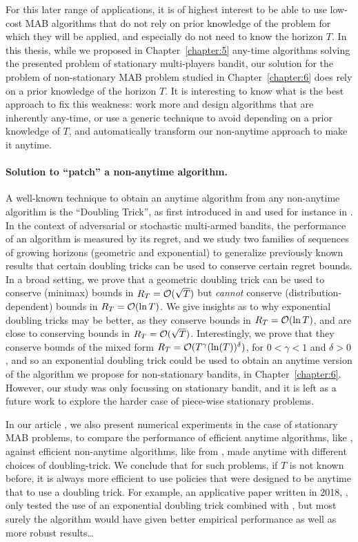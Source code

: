 For this later range of applications, it is of highest interest to be able to use low-cost MAB algorithms that do not rely on prior knowledge of the problem for which they will be applied, and especially do not need to know the horizon $T$.
In this thesis,
while we proposed in Chapter~\ref{chapter:5} any-time algorithms solving the presented problem of stationary multi-players bandit, our solution for the problem of non-stationary MAB problem studied in Chapter~\ref{chapter:6} does rely on a prior knowledge of the horizon $T$.
It is interesting to know what is the best approach to fix this weakness: work more and design algorithms that are inherently any-time, or use a generic technique to avoid depending on a prior knowledge of $T$, and automatically transform our non-anytime approach to make it anytime.


\paragraph{Solution to ``patch'' a non-anytime algorithm.}
%
A well-known technique to obtain an anytime algorithm from any non-anytime algorithm is the ``Doubling Trick'', as first introduced in \cite{CesaLugosi06} and used for instance in \cite{Auer10,AuerGajaneOrtner18}.
%
In the context of adversarial or stochastic multi-armed bandits,
the performance of an algorithm is measured by its regret,
and we study two families of sequences of growing horizons (geometric and exponential)
to generalize previously known results that certain doubling tricks can be used to conserve certain regret bounds.
In a broad setting, we prove that a geometric doubling trick can be used to conserve (minimax) bounds in $R_T = \mathcal{O}(\sqrt{T})$ but \emph{cannot} conserve (distribution-dependent) bounds in $R_T = \mathcal{O}(\ln T)$.
We give insights as to why exponential doubling tricks may be better, as they conserve bounds in $R_T = \mathcal{O}(\ln T)$, and are close to conserving bounds in $R_T = \mathcal{O}(\sqrt{T})$.
Interestingly, we prove that they conserve bounds of the mixed form $R_T = \mathcal{O}(T^{\gamma} (\ln(T))^{\delta})$, for $0<\gamma<1$ and $\delta>0$, and so an exponential doubling trick could be used to obtain an anytime version of the algorithm we propose for non-stationary bandits, \GLRklUCB{} in Chapter~\ref{chapter:6}.
However, our study was only focussing on stationary bandit, and it is left as a future work to explore the harder case of piece-wise stationary problems.

In our article \cite{Besson2018DoublingTricks}, we also present numerical experiments in the case of stationary MAB problems, to compare the performance of efficient anytime algorithms, like \klUCB, against efficient non-anytime algorithms, like \KLUCBpp{} from \cite{Menard17}, made anytime with different choices of doubling-trick.
We conclude that for such problems, if $T$ is not known before, it is always more efficient to use policies that were designed to be anytime that to use a doubling trick.
For example, an applicative paper written in 2018, \cite{li2019useDoublingTrick}, only tested the use of an exponential doubling trick combined with \KLUCBpp, but most surely the \klUCB{} algorithm would have given better empirical performance as well as more robust results\ldots


